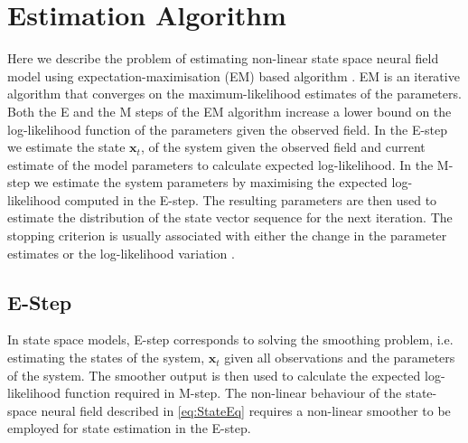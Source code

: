 \documentclass[]{article}
\begin{document}
\section{Estimation Algorithm}\label{sec:EstimationAlgorithm}
Here we describe the problem of estimating non-linear state space neural field model using expectation-maximisation (EM) based algorithm \cite{Dempster1977,Shumway2000}. EM is an iterative algorithm that converges on the maximum-likelihood estimates of the parameters. Both the E and the M steps of the EM algorithm increase a lower bound on the log-likelihood function of the parameters given the observed field.  In the E-step we estimate the state $\mathbf x_t$, of the system given the observed field and current estimate of the model parameters to calculate expected log-likelihood. In the M-step we estimate the system parameters by maximising the expected log-likelihood computed in the E-step. The resulting parameters are then used to estimate the distribution of the state vector sequence for the next iteration. The stopping criterion is usually associated with either the change in the parameter estimates or the log-likelihood variation \cite{McLachlan1997}.
\subsection{E-Step}
In state space models, E-step corresponds to solving the smoothing problem, i.e. estimating the states of the system, $\mathbf x_t$ given all observations and the parameters of the system. The smoother output is then used to calculate the expected log-likelihood function required in M-step. The non-linear behaviour of the state-space neural field described in \eqref{eq:StateEq} requires a non-linear smoother to be employed for state estimation in the E-step.
\end{document}
